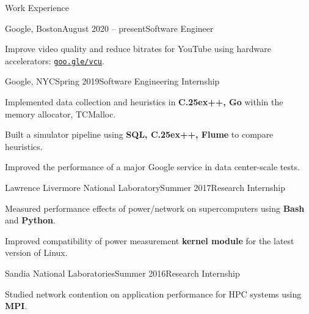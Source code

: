\documentclass{resume}
\def\bfCplusplus{{\rm{\bf C\raise.25ex\hbox{\small ++}}}}
\begin{document}
\begin{rSection}{Work Experience}

\begin{rWorksection}{Google, Boston}{August 2020 -- present}{Software Engineer}
\item Improve video quality and reduce bitrates for YouTube using hardware
    accelerators: \href{http://goo.gle/vcu}{\nolinkurl{goo.gle/vcu}}.
\end{rWorksection}

\begin{rWorksection}{Google, NYC}{Spring 2019}{Software Engineering
    Internship}
\item Implemented data collection and heuristics in {\bf \bfCplusplus{}, Go} within the memory
  allocator, TCMalloc.
\item Built a simulator pipeline using {\bf SQL, \bfCplusplus{}, Flume} to
  compare heuristics.
\item Improved the performance of a major Google service in data center-scale tests.
\end{rWorksection}

\begin{rWorksection}{Lawrence Livermore National Laboratory}{Summer
    2017}{Research Internship}
\item Measured performance effects of power/network on supercomputers using {\bf
    Bash} and {\bf Python}.
\item Improved compatibility of power measurement {\bf kernel module} for the
  latest version of Linux.
\end{rWorksection}


\begin{rWorksection}{Sandia National Laboratories}{Summer 2016}{Research
    Internship}
\item Studied network contention on application performance for HPC systems
  using {\bf MPI}.
\end{rWorksection}

\end{rSection}
\end{document}
